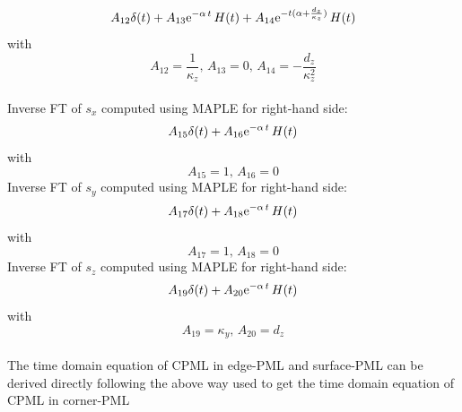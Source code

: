\documentclass[onecolumn,extra]{gji_modified_cours_UPPA}
\begin{document}
$$ A_{12}\delta(t) + A_{13} {\rm e}^{-\alpha\,t} \, H(t) + A_{14} {\rm e}^{-t(\alpha+\frac{d_z}{\kappa_z})} \, H(t) $$
with
$$A_{12}=\frac{1}{\kappa_z} ,\,A_{13}=0,
\,A_{14}=-\frac{d_z}{\kappa^2_z}$$\\
\noindent
Inverse FT of $s_x$ computed using MAPLE for right-hand side:
$$A_{15}\delta(t) + A_{16} {\rm e}^{-\alpha \,t} \, H(t) $$
with
$$A_{15}= 1, \, A_{16}=0 $$
\noindent
Inverse FT of $s_y$ computed using MAPLE for right-hand side:
$$A_{17}\delta(t) + A_{18} {\rm e}^{-\alpha \,t} \, H(t) $$
with
$$A_{17}= 1, \, A_{18}=0 $$
\noindent
Inverse FT of $s_z$ computed using MAPLE for right-hand side:
$$A_{19}\delta(t) + A_{20} {\rm e}^{-\alpha \,t} \, H(t) $$
with
$$A_{19}= \kappa_y, \, A_{20}=d_z $$
\\
The time domain equation of CPML in edge-PML and surface-PML can be derived directly following the above way used to get the
time domain equation of CPML in corner-PML
\\
\end{document}
